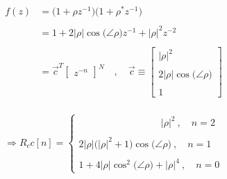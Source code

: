 \documentclass{article}
\begin{document}
\begin{align*}
    f(z)&= \big(1 + \rho z^{-1}\big)\big(1 + \rho^{*}z^{-1}\big) \\ \\
        &= 1 + 2\big|\rho\big|\cos\big(\angle{\rho}\big)z^{-1} + \big|\rho\big|^{2}z^{-2} \\ \\
        &=\vec{c}^{T}\begin{bmatrix} z^{-n} \end{bmatrix}^{N} \quad, \quad \vec{c} \equiv \begin{bmatrix}
                                                                                                                       \big|\rho\big|^{2} \\ \\
                                                                                                2\big|\rho\big|\cos\big(\angle{\rho}\big) \\ \\
                                                                                                                                        1
                                                                                            \end{bmatrix} \\
  \end{align*}

\begin{equation*}
    \Rightarrow R_cc[n] = \begin{cases}
                                \quad \quad \quad \quad \quad \quad \quad \quad \ \ \big|\rho\big|^{2} \ , \quad n = 2 \\ \\
                                2\big|\rho\big|\bigg(\big|\rho\big|^{2} + 1\bigg)\cos\big(\angle{\rho}\big) \ , \quad n = 1 \\ \\
                                1 + 4\big|\rho\big|\cos^{2}\big(\angle{\rho}\big) + \big|\rho\big|^{4} \ , \quad n = 0
                            \end{cases}
  \end{equation*}
\end{document}
